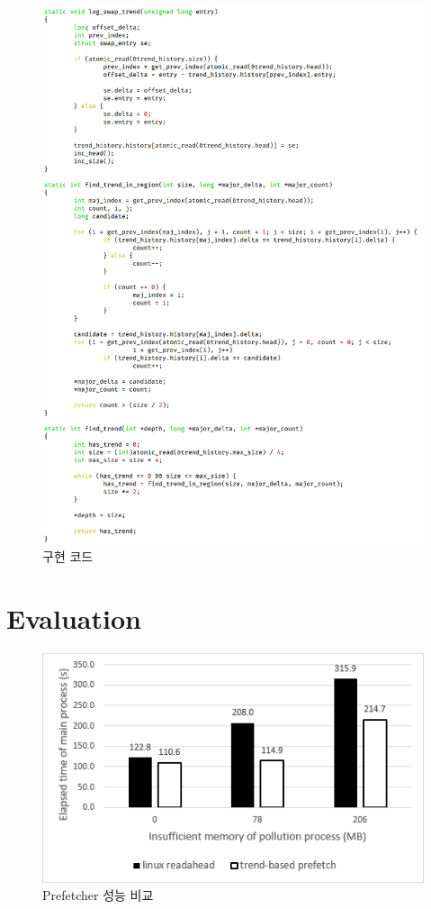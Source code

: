 \documentclass[conference,11pt]{IEEEtran}
\begin{document}
\begin{CJK}{UTF8}{}
    \begin{figure}[p]
        \centerline{\includegraphics[height=\textheight]{code.png}}
        \caption{구현 코드}
        \label{fig:code}
    \end{figure}

    \section{Evaluation} \label{sec:evaluation}

    \begin{figure}[t]
        \centerline{\includegraphics[width=\linewidth]{result.png}}
        \caption{Prefetcher 성능 비교}
        \label{fig:result}
    \end{figure}


\end{CJK}
\end{document}
